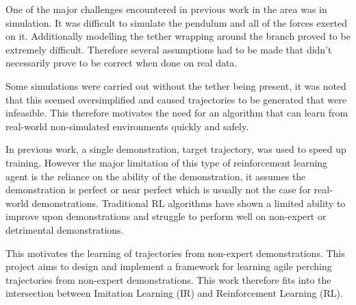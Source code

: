 One of the major challenges encountered in previous work in the area was in simulation.
It was difficult to simulate the pendulum and all of the forces exerted on it.
Additionally modelling the tether wrapping around the branch proved to be extremely difficult.
Therefore several assumptions had to be made that didn't necessarily prove to be correct when done on real data.

Some simulations were carried out without the tether being present, it was noted that this seemed oversimplified and caused trajectories to be generated that were infeasible.
This therefore motivates the need for an algorithm that can learn from real-world non-simulated environments quickly and safely.

In previous work, a single demonstration, target trajectory, was used to speed up training.
However the major limitation of this type of reinforcement learning agent is the reliance on the ability of the demonstration, it assumes the demonstration is perfect or near perfect which is usually not the case for real-world demonstrations.
Traditional RL algorithms have shown a limited ability to improve upon demonstrations and struggle to perform well on non-expert or detrimental demonstrations.

This motivates the learning of trajectories from non-expert demonstrations.
This project aims to design and implement a framework for learning agile perching trajectories from non-expert demonstrations.
This work therefore fits into the intersection between Imitation Learning (IR) and Reinforcement Learning (RL).